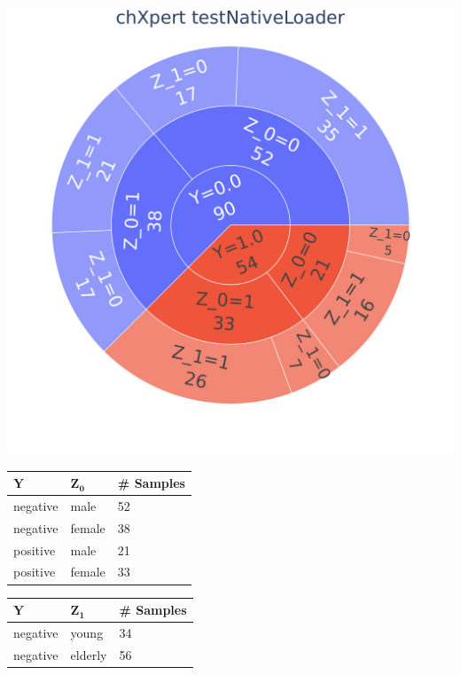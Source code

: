 \documentclass[12pt,DIV14,BCOR12mm,a4paper,footinclude=false,headinclude,parskip=half-,twoside,openright,cleardoublepage=empty,toc=index,bibliography=totoc,listof=totoc]{scrreprt}
\numberwithin{equation}{chapter}
\begin{document}
\begin{table}[H]
    \begin{minipage}[H]{\linewidth}
        \centering
        \begin{minipage}[H]{0.5\linewidth}
            \centering
            \includegraphics[width=0.8\linewidth]{thesis/figures/data_distribution_chXpert_testNativeLoader_5.pdf}
        \end{minipage}%
        \hfill
        \begin{minipage}[H]{0.5\linewidth}
            \centering
            \small
            \begin{tabular}{|p{1.25cm}|p{1.75cm}|p{2cm}|}
                \hline
                $\mathbf{Y}$ & $\mathbf{Z_0}$ & \# \textbf{Samples } \\
                \hline
                negative & male &  52\\
                negative & female & 38\\
                positive & male & 21\\
                positive & female & 33\\
                \hline
            \end{tabular}
            \begin{tabular}{|p{1.25cm}|p{1.75cm}|p{2cm}|}
                \hline
                $\mathbf{Y}$ & $\mathbf{Z_1}$ & \# \textbf{Samples } \\
                \hline
                negative & young & 34\\
                negative & elderly & 56\\

\end{tabular}
\end{minipage}
\end{minipage}
\end{table}
\end{document}
